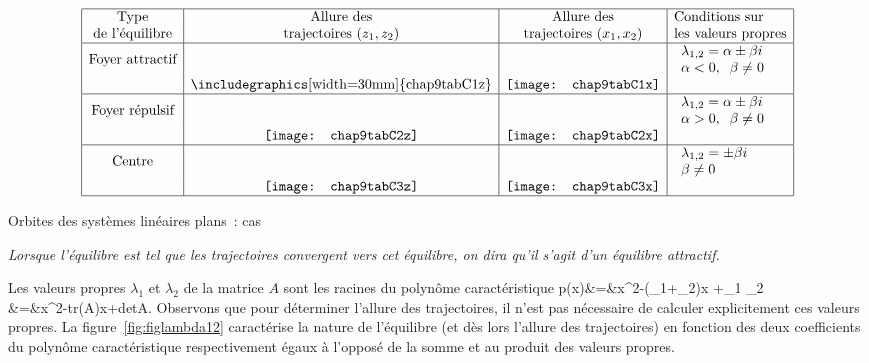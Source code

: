 \begin{table}
\begin{eqnarray*}
\begin{array}{|c|c|c|l|}
\hline
\mbox{Type}&\mbox{Allure des}& \mbox{Allure des} &\mbox{Conditions sur}\\
\mbox{de l'{é}quilibre}&\mbox{trajectoires }(z_1,z_2)&\mbox{trajectoires }(x_1,x_2)&\mbox{les valeurs propres}\\
\hline
\mbox{Foyer attractif} & & &\begin{array}{l}
\lambda_{1,2} = \alpha \pm \beta i\\
\alpha < 0 , \;\; \beta \neq 0 \end{array}\\
&\mbox{\includegraphics[width=30mm]
{chap9tabC1z}}&\mbox{\texttt{[image: chap9tabC1x]}} &\\
\hline
\mbox{Foyer répulsif} & & &\begin{array}{l}
\lambda_{1,2} = \alpha \pm \beta i\\
\alpha >0 , \;\; \beta \neq 0 \end{array}\\
&\mbox{\texttt{[image: chap9tabC2z]}}&\mbox{\texttt{[image: chap9tabC2x]}} &\\
\hline
\mbox{Centre} & & &\begin{array}{l}
\lambda_{1,2} = \pm \beta i\\
 \beta \neq 0 \end{array}\\
&\mbox{\texttt{[image: chap9tabC3z]}}& \mbox{\texttt{[image: chap9tabC3x]}}&\\
\hline
\end{array}
\end{eqnarray*}
\caption{Orbites des systèmes linéaires plans~: cas}
\label{tablec}
\end{table}
\renewcommand{\arraystretch}{1.0}

\begin{definition}{\em
 Lorsque l'{é}quilibre est tel que les trajectoires con\-ver\-gent vers cet
{é}quilibre, on dira qu'il s'agit d'un {é}quilibre {\em attractif}.}\cqfd
\end{definition}

Les valeurs propres $\lambda_1$ et $\lambda_2$ de la matrice $A$ sont les racines du polyn{\^o}me  caractéristique
\eqnn
p(x)&=&x^2-(\lambda_1+\lambda_2)x +\lambda_1 \lambda_2\\
&=&x^2-\mbox{tr}(A)x+\mbox{det}A.
\eeqnn
 Observons que pour
d{é}terminer l'allure des trajectoires, il n'est pas n{é}cessaire de
calculer explicitement ces valeurs propres. La figure~\ref{fig:figlambda12}
caract{é}rise la nature de l'{é}quilibre (et d{è}s lors l'allure des
trajectoires) en fonction des deux coefficients du polyn{\^o}me
caract{é}ristique respectivement {é}gaux {à} l'oppos{é} de la somme et au
produit des valeurs propres.

